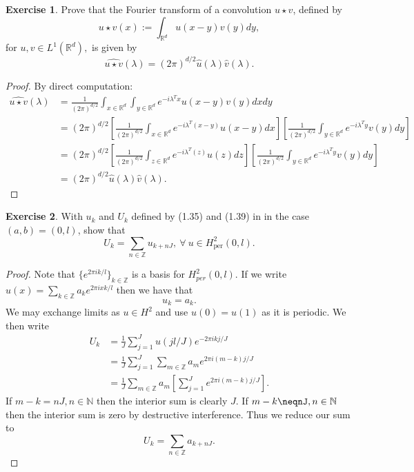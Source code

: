 \documentclass{amsart}
\theoremstyle{plain}
\theoremstyle{definition}
\newtheorem{exer}{Exercise}[section]
\newcommand{\R}{\mathbb{R}}
\newcommand{\Z}{\mathbb{Z}}
\newcommand{\N}{\mathbb{N}}
\begin{document}
\begin{exer}
     Prove that the Fourier transform of a convolution $u\star v$, defined by
    $$u\star v(x)  := \int_{\R^d} u(x-y)v(y) dy,$$
    for $u,v \in L^1(\R^d),$ is given by 
    $$\widehat{u\star v}(\lambda) = \left(2\pi\right)^{d/2} \widehat{u}(\lambda)\widehat{v}(\lambda).$$
\end{exer}
\begin{proof}
By direct computation:
\begin{align*}
    \widehat{u\star v}(\lambda)&= \frac{1}{\left(2\pi\right)^{d/2}}\int_{x\in \R^d} \int_{y \in \R^d} e^{-i\lambda^T x} u(x-y)v(y) dx dy\\
    &= \left(2\pi\right)^{d/2}\left[ \frac{1}{\left(2\pi\right)^{d/2}}\int_{x\in \R^d} e^{-i\lambda^T (x-y)}u(x-y) dx \right]\left[ \frac{1}{\left(2\pi\right)^{d/2}}\int_{y\in \R^d} e^{-i\lambda^T y}v(y) dy\right]\\
    &= \left(2\pi\right)^{d/2}\left[ \frac{1}{\left(2\pi\right)^{d/2}}\int_{z\in \R^d} e^{-i\lambda^T (z)}u(z) dz \right]\left[ \frac{1}{\left(2\pi\right)^{d/2}}\int_{y\in \R^d} e^{-i\lambda^T y}v(y) dy\right]\\
    &= {\left(2\pi\right)^{d/2}}\widehat{u}(\lambda)\widehat{v}(\lambda).
\end{align*}    
\end{proof}

\begin{exer}
\label{Exercise 1.22}
With $u_k$ and $U_k$ defined by (1.35) and (1.39) in \cite{lord2014introduction} in the case $(a,b) =(0,l)$, show that
$$U_k = \sum_{n\in \Z} u_{k+nJ}, \ \forall \ u\in H^2_{\text{per}}(0,l).$$
\end{exer}
\begin{proof}
    Note that $\{e^{2\pi i k/l}\}_{k\in \Z}$ is a basis for $H^2_{per}(0,l).$ If we write $u(x) =\sum_{k\in\Z} a_k e^{2\pi i x k/l}$ then we have that
    $$u_k = a_k. $$
    We may exchange limits as $u\in H^2$ and use $u(0)= u(1)$ as it is periodic. We then write
    \begin{align*}
        U_k &= \frac{1}{J}\sum_{j=1}^J u(jl/J) e^{-2\pi i k j/J}\\
        &= \frac{1}{J}\sum_{j=1}^J \sum_{m\in \Z}  a_m e^{2\pi i(m-k) j/J }\\
        &= \frac{1}{J}\sum_{m\in\Z}a_m\left[\sum_{j=1}^J  e^{2\pi i (m-k)j/J}\right].
    \end{align*}
    If $m-k=nJ, n\in \N$ then the interior sum is clearly $J$. If $m-k\neqnJ, n\in\N$ then the interior sum is zero by destructive interference. Thus we reduce our sum to
    $$U_k = \sum_{n\in\Z}a_{k+nJ}.$$
\end{proof}
\end{document}
